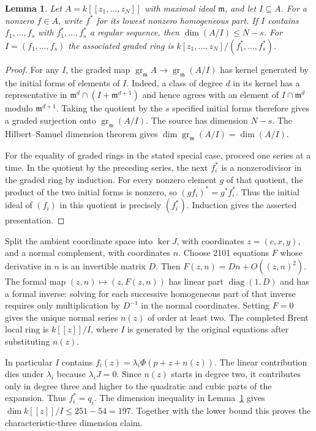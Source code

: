 \documentclass[11pt]{amsart}
\newtheorem{lemma}[theorem]{Lemma}
\begin{document}
\begin{lemma}\label{lem:initial}
Let $A=k[[z_1,\ldots,z_N]]$ with maximal ideal $\mathfrak m$, and let
$I\subseteq A$. For a nonzero $f\in A$, write $f^*$ for its lowest
nonzero homogeneous part. If $I$ contains $f_1,\ldots,f_s$ with
$f_1^*,\ldots,f_s^*$ a regular sequence, then $\dim(A/I)\le N-s$.
For $I=(f_1,\ldots,f_s)$ the associated graded ring is
$k[z_1,\ldots,z_N]/(f_1^*,\ldots,f_s^*)$.
\end{lemma}
\begin{proof}
For any $I$, the graded map $\operatorname{gr}_{\mathfrak m}A\to
\operatorname{gr}_{\mathfrak m}(A/I)$ has kernel generated by the
initial forms of elements of $I$. Indeed, a class of degree $d$
in its kernel has a representative in
$\mathfrak m^d\cap(I+\mathfrak m^{d+1})$ and hence agrees with
an element of $I\cap\mathfrak m^d$ modulo $\mathfrak m^{d+1}$.
Taking the quotient by the $s$ specified initial forms therefore
gives a graded surjection onto $\operatorname{gr}_{\mathfrak m}(A/I)$.
The source has dimension $N-s$. The Hilbert--Samuel dimension
theorem gives $\dim\operatorname{gr}_{\mathfrak m}(A/I)=\dim(A/I)$.

For the equality of graded rings in the stated special case, proceed
one series at a time. In the quotient by the preceding series,
the next $f_i^*$ is a nonzerodivisor in the graded ring by induction.
For every nonzero element $g$ of that quotient, the product of the
two initial forms is nonzero, so $(gf_i)^*=g^*f_i^*$. Thus the initial
ideal of $(f_i)$ in this quotient is precisely $(f_i^*)$. Induction
gives the asserted presentation.
\end{proof}

Split the ambient coordinate space into $\ker J$, with coordinates
$z=(c,x,y)$, and a normal complement, with coordinates $n$.
Choose 2101 equations $F$ whose derivative in $n$ is an invertible
matrix $D$. Then $F(z,n)=Dn+O((z,n)^2)$. The formal map
$(z,n)\mapsto(z,F(z,n))$ has linear part $\operatorname{diag}(1,D)$
and has a formal inverse: solving for each successive homogeneous
part of that inverse requires only multiplication by $D^{-1}$
in the normal coordinates. Setting $F=0$ gives the unique normal
series $n(z)$ of order at least two. The completed Brent local
ring is $k[[z]]/I$, where $I$ is generated by the original
equations after substituting $n(z)$.

In particular $I$ contains $f_i(z)=\lambda_i\Phi(p+z+n(z))$.
The linear contribution dies under $\lambda_i$ because $\lambda_i J=0$.
Since $n(z)$ starts in degree two, it contributes only in degree
three and higher to the quadratic and cubic parts of the expansion.
Thus $f_i^*=q_i$. The dimension inequality in
Lemma~\ref{lem:initial} gives $\dim k[[z]]/I\le251-54=197$.
Together with the lower bound this proves the characteristic-three
dimension claim.
\end{document}
